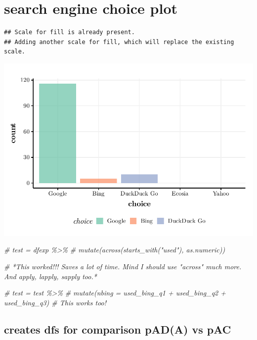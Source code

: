 \documentclass[
  11pt,
]{article}
\newenvironment{Shaded}{\begin{snugshade}}{\end{snugshade}}
\newcommand{\CommentTok}[1]{\textcolor[rgb]{0.56,0.35,0.01}{\textit{#1}}}
\begin{document}
\hypertarget{search-engine-choice-plot}{%
\section{search engine choice plot}\label{search-engine-choice-plot}}

\begin{verbatim}
## Scale for fill is already present.
## Adding another scale for fill, which will replace the existing scale.
\end{verbatim}

\includegraphics{analysis-July19_files/figure-latex/unnamed-chunk-9-1.pdf}

\begin{Shaded}
\begin{Highlighting}[]
\CommentTok{\# test = dfexp \%\textgreater{}\% }
\CommentTok{\#   mutate(across(starts\_with("used"), as.numeric)) }

\CommentTok{\#\textquotesingle{} *This worked!!! Saves a lot of time. Mind I should use "across" much more. And apply, lapply, sapply too.*}

\CommentTok{\# test = test \%\textgreater{}\% }
\CommentTok{\#   mutate(nbing = used\_bing\_q1 + used\_bing\_q2 + used\_bing\_q3) \# This works too!}
\end{Highlighting}
\end{Shaded}

\hypertarget{creates-dfs-for-comparison-pada-vs-pac}{%
\subsection{creates dfs for comparison pA\textbar D(A) vs pA\textbar C}\label{creates-dfs-for-comparison-pada-vs-pac}}
\end{document}
